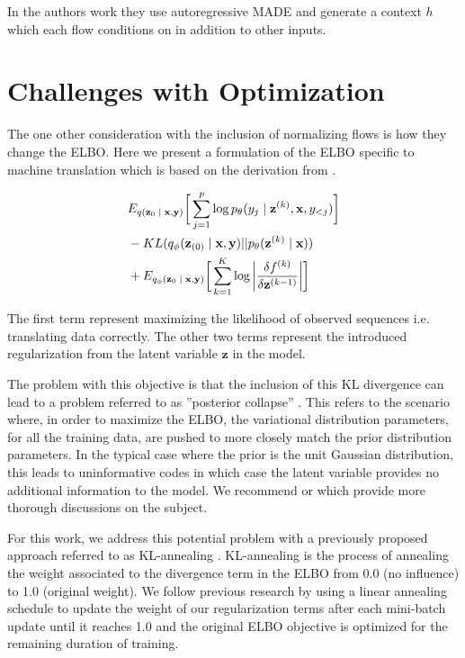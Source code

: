 In the authors work they use autoregressive MADE \cite{gregor2015MADE} and generate a context $h$ which each flow conditions on in addition to other inputs. 

\section{Challenges with Optimization}

The one other consideration with the inclusion of normalizing flows is how they change the ELBO. Here we present a formulation of the ELBO specific to machine translation which is based on the derivation from \citealp[Section 4.2]{rezende2015VIwithNF}.

\begin{align}
\begin{split}\label{eq:2}
&
E_{q(\textbf{z}_{0}\; | \;{\textbf{x}, \textbf{y}})} \bigg[ \sum_{j=1}^{p} \log p_{\theta}(y_{j} \; | \;{\textbf{z}^{(k)}}, \textbf{x}, y_{<j}) \bigg] \\
& - KL(q_{\phi}(\textbf{z}_{(0)} \; | \;{\textbf{x}, \textbf{y}}) || p_{\theta}(\textbf{z}^{(k)} \; | \;{\textbf{x}})) \\
&   +  E_{q_{\phi}(\textbf{z}_{0} \; | \;{\textbf{x}, \textbf{y}})} \bigg[\sum_{k=1}^{K} \log \bigg|\frac{\delta f^{(k)}}{\delta \textbf{z}^{(k-1)}} \bigg| \bigg]  
\end{split}
\end{align}

The first term represent maximizing the likelihood of observed sequences i.e. translating data correctly. The other two terms represent the introduced regularization from the latent variable $\textbf{z}$ in the model. 

The problem with this objective is that the inclusion of this KL divergence can lead to a problem referred to as ''posterior collapse'' \cite{he2018lagging}. This refers to the scenario where, in order to maximize the ELBO, the variational distribution parameters, for all the training data, are pushed to more closely match the prior distribution parameters. In the typical case where the prior is the unit Gaussian distribution, this leads to uninformative codes in which case the latent variable provides no additional information to the model. We recommend \citet{chen2016VariationalLossyAE} or \citet{zhao2017InfoVAE} which provide more thorough discussions on the subject. 

 

For this work, we address this potential problem with a previously proposed approach referred to as KL-annealing \cite{bowman2015GeneratingSent,sonderby2016LadderVAE}. KL-annealing is the process of annealing the weight associated to the divergence term in the ELBO from 0.0 (no influence) to 1.0 (original weight). We follow previous research by using a linear annealing schedule to update the weight of our regularization terms after each mini-batch update until it reaches 1.0 and the original ELBO objective is optimized for the remaining duration of training. 
